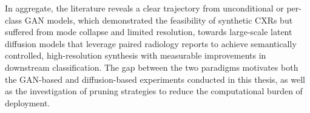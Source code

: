 In aggregate, the literature reveals a clear trajectory from unconditional or per-class GAN
models, which demonstrated the feasibility of synthetic CXRs but suffered from mode collapse
and limited resolution, towards large-scale latent diffusion models that leverage paired
radiology reports to achieve semantically controlled, high-resolution synthesis with measurable
improvements in downstream classification. The gap between the two paradigms motivates both
the GAN-based and diffusion-based experiments conducted in this thesis, as well as the
investigation of pruning strategies to reduce the computational burden of deployment.